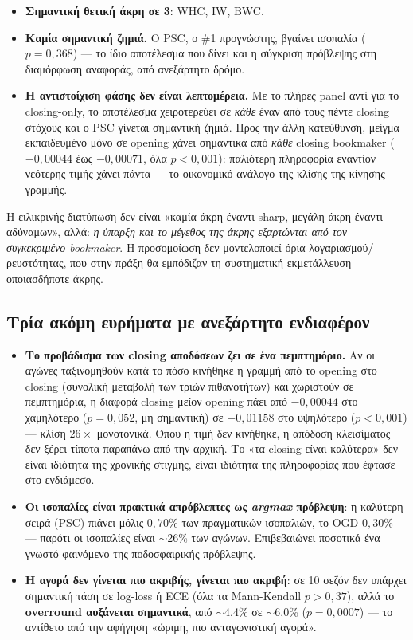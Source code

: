 \documentclass[11pt,a4paper]{article}
\renewcommand{\_}{\oldunderscore\allowbreak}
\begin{document}
\begin{itemize}
  \item \textbf{Σημαντική θετική άκρη σε 3}: WHC, IW, BWC.
  \item \textbf{Καμία σημαντική ζημιά.} Ο PSC, ο \#1 προγνώστης, βγαίνει ισοπαλία
        ($p=0{,}368$) --- το ίδιο αποτέλεσμα που δίνει και η σύγκριση πρόβλεψης στη
        διαμόρφωση αναφοράς, από ανεξάρτητο δρόμο.
  \item \textbf{Η αντιστοίχιση φάσης δεν είναι λεπτομέρεια.} Με το πλήρες panel αντί για το
        closing-only, το αποτέλεσμα χειροτερεύει σε \emph{κάθε} έναν από τους πέντε closing
        στόχους και ο PSC γίνεται σημαντική ζημιά. Προς την άλλη κατεύθυνση, μείγμα
        εκπαιδευμένο μόνο σε opening χάνει σημαντικά από \emph{κάθε} closing bookmaker
        ($-0{,}00044$ έως $-0{,}00071$, όλα $p<0{,}001$): παλιότερη πληροφορία εναντίον
        νεότερης τιμής χάνει πάντα --- το οικονομικό ανάλογο της κλίσης της κίνησης γραμμής.
\end{itemize}

Η ειλικρινής διατύπωση δεν είναι «καμία άκρη έναντι sharp, μεγάλη άκρη έναντι αδύναμων»,
αλλά: \emph{η ύπαρξη και το μέγεθος της άκρης εξαρτώνται από τον συγκεκριμένο bookmaker}. Η
προσομοίωση δεν μοντελοποιεί όρια λογαριασμού/ρευστότητας, που στην πράξη θα εμπόδιζαν τη
συστηματική εκμετάλλευση οποιασδήποτε άκρης.

\subsection{Τρία ακόμη ευρήματα με ανεξάρτητο ενδιαφέρον}

\begin{itemize}
  \item \textbf{Το προβάδισμα των closing αποδόσεων ζει σε ένα πεμπτημόριο.} Αν οι αγώνες
        ταξινομηθούν κατά το πόσο κινήθηκε η γραμμή από το opening στο closing (συνολική
        μεταβολή των τριών πιθανοτήτων) και χωριστούν σε πεμπτημόρια, η διαφορά closing
        μείον opening πάει από $-0{,}00044$ στο χαμηλότερο ($p=0{,}052$, μη σημαντική) σε
        $-0{,}01158$ στο υψηλότερο ($p<0{,}001$) --- κλίση $26\times$ μονοτονικά. Όπου η τιμή
        δεν κινήθηκε, η απόδοση κλεισίματος δεν ξέρει τίποτα παραπάνω από την αρχική. Το
        «τα closing είναι καλύτερα» δεν είναι ιδιότητα της χρονικής στιγμής, είναι ιδιότητα
        της πληροφορίας που έφτασε στο ενδιάμεσο.
  \item \textbf{Οι ισοπαλίες είναι πρακτικά απρόβλεπτες ως \emph{argmax} πρόβλεψη}: η
        καλύτερη σειρά (PSC) πιάνει μόλις $0{,}70\%$ των πραγματικών ισοπαλιών, το OGD
        $0{,}30\%$ --- παρότι οι ισοπαλίες είναι $\sim$26\% των αγώνων. Επιβεβαιώνει ποσοτικά
        ένα γνωστό φαινόμενο της ποδοσφαιρικής πρόβλεψης.
  \item \textbf{Η αγορά δεν γίνεται πιο ακριβής, γίνεται πιο ακριβή}: σε 10 σεζόν δεν
        υπάρχει σημαντική τάση σε log-loss ή ECE (όλα τα Mann-Kendall $p>0{,}37$), αλλά το
        \textbf{overround αυξάνεται σημαντικά}, από $\sim$4,4\% σε $\sim$6,0\%
        ($p=0{,}0007$) --- το αντίθετο από την αφήγηση «ώριμη, πιο ανταγωνιστική αγορά».
\end{itemize}
\end{document}
